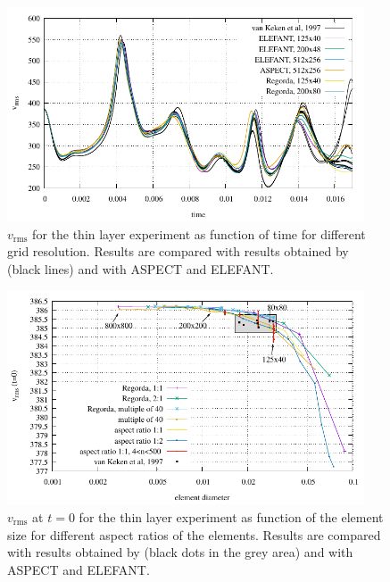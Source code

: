 \documentclass[hidelinks,10pt,a4paper]{article}
\begin{document}
\begin{figure}
\centering
\noindent\includegraphics[width=400px]{./Figures/vrms_thin.pdf}
\caption{$v_{\textrm{rms}}$ for the thin layer experiment as function of time for different grid resolution. Results are compared with results obtained by
\citet{vanKeken1997} (black lines) and with ASPECT and ELEFANT.}
\label{fig:thin}
\end{figure}

\begin{figure}
\centering
\noindent\includegraphics[width=400px]{./Figures/vrmszero.pdf}
\caption{$v_{\textrm{rms}}$ at $t=0$ for the thin layer experiment as function of the element size for different aspect ratios of the elements. Results are compared
with results obtained by \citet{vanKeken1997} (black dots in the grey area) and with ASPECT and ELEFANT.}
\label{fig:thin_initial}
\end{figure}
\end{document}
